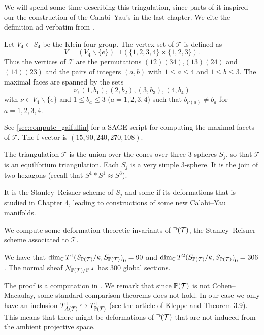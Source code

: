 We will spend some time describing this tringulation, since parts of it inspired our the construction of the Calabi--Yau's in the last chapter. We cite the definition ad verbatim from \cite{cp2_15_chess}. 

 \begin{definition}
 Let $V_4 \subset S_4$ be the Klein four group. The vertex set of $\mathcal T$ is defined as
 \begin{equation}
 V = (V_4 \backslash \{e \}) \sqcup \left( \{1,2,3,4 \} \times \{ 1,2,3 \} \right).
 \end{equation}
 Thus the vertices of $\mathcal T$ are the permutations $(12)(34)$,$(13)(24)$ and $(14)(23)$ and the pairs of integers $(a,b)$ with $1 \leq a \leq 4$ and $1 \leq b \leq 3$. The maximal faces are spanned by the sets 
 \begin{equation}
 \nu, (1,b_1), (2,b_2), (3,b_3), (4,b_4)
 \end{equation}
 with $\nu \in V_4 \backslash \{ e \}$ and $1 \leq b_a \leq 3$ ($a=1,2,3,4$) such that $b_{\nu(a)} \neq b_a$ for $a=1,2,3,4$.
 \end{definition}

See \cref{sec:compute_gaifullin} for a SAGE \cite{sagemath} script for computing the maximal facets of $\mathcal T$. The f-vector is $(15,90,240,270,108)$.

The triangulation $\mathcal T$ is the union over the cones over three $3$-spheres $S_j$, so that $\mathcal T$ is an equilibrium triangulation. Each $S_j$ is a very simple $3$-sphere. It is the join of two hexagons (recall that $S^1 \ast S^1 \approx S^3$).

It is the Stanley--Reisner-scheme of $S_j$ and some if its deformations that is studied in Chapter 4, leading to constructions of some new Calabi--Yau manifolds. 

We compute some deformation-theoretic invariants of $\P(\mathcal T)$, the Stanley--Reisner scheme associated to $\mathcal T$.

\begin{proposition}
We have that $\dim_\C  {T^1(S_{\P(\mathcal T)}/k, S_{\P(\mathcal T)})}_0=90$ and $\dim_\C {T^2(S_{\P(\mathcal T)}/k, S_{\P(\mathcal T)})}_0=306$. The normal sheaf $\mathcal N_{\P(\mathcal T)/\P^{14}}$ has $300$ global sections.
\end{proposition}

The proof is a computation in \MM. We remark that since $\P(\mathcal T)$ is not Cohen--Macaulay, some standard comparison theorems does not hold. In our case we only have an inclusion $T^1_{A(\mathcal T)} \hookrightarrow T^1_{\P(\mathcal T)}$ (see the article of Kleppe \cite{kleppe_deformations} and Theorem 3.9). This means that there might be deformations of $\P(\mathcal T)$ that are not induced from the ambient projective space. 

